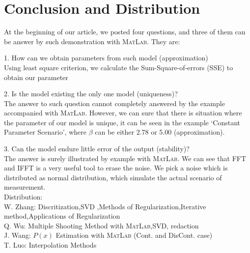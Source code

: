 \documentclass[a4paper]{article}
\begin{document}
\section{Conclusion and Distribution}
At the beginning of our article, we posted four questions, and three of them can be answer by such demonstration with \textsc{MatLab}. They are:
\par
1. How can we obtain parameters from such model (approximation)\\
Using least square criterion, we calculate the Sum-Square-of-errors (SSE) to obtain our parameter\
\par
2. Is the model existing the only one model (uniqueness)?\\
The answer to such question cannot completely answered by the example accompanied with \textsc{MatLab}. However, we can sure that there is situation where the parameter of our model is unique, it can be seen in the example ‘Constant Parameter Scenario’, where $\beta$ can be either 2.78 or 5.00 (approximation).
\par
3. Can the model endure little error of the output (stability)?\\
The answer is surely illustrated by example with \textsc{MatLab}. We can see that FFT and IFFT is a very useful tool to erase the noise. We pick a noise which is distributed as normal distribution, which simulate the actual scenario of measurement.\\

Distribution:\\
W. Zhang: Discritization,SVD ,Methods of Regularization,Iterative method,Applications of Regularization\\
Q. Wu: Multiple Shooting Method with \textsc{MatLab},SVD, redaction\\
J. Wang: $P(x)$ Estimation with \textsc{MatLab} (Cont. and DisCont. case)\\
T. Luo: Interpolation Methods\\
\end{document}
